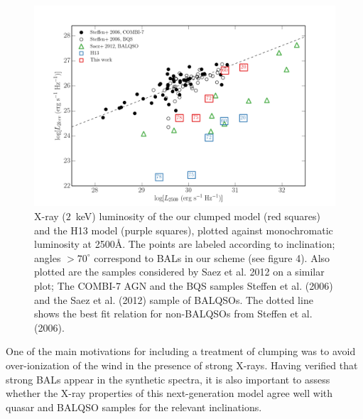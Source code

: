\documentclass[useAMS,usenatbib]{mn2e_x}
\begin{document}
\begin{figure} %
\centering
\includegraphics[width=1.0\textwidth]{figures/lx_a05_pre.png}
\caption
{
X-ray ($2$~keV) luminosity of the our clumped model (red squares) 
and the H13 model (purple squares), plotted against monochromatic luminosity 
at 2500\AA. The points are labeled according to inclination; angles
$>70^\circ$ correspond to BALs in our scheme (see figure 4).
Also plotted are the samples considered by Saez et al. 2012 on a similar plot; 
The COMBI-7 AGN and the BQS samples Steffen et al. (2006) and the Saez et al. (2012) 
sample of BALQSOs. The dotted line shows the best fit relation for non-BALQSOs 
from Steffen et al. (2006).
}
\label{fig:xray}
\end{figure} %

\begin{figure}
\end{figure}


One of the main motivations for including a treatment of clumping was
to avoid over-ionization of the wind in the presence of strong X-rays. 
Having verified that strong BALs appear in the synthetic spectra,
it is also important to assess whether the X-ray properties of this
next-generation model agree well with quasar and BALQSO samples for the relevant
inclinations.
\end{document}

